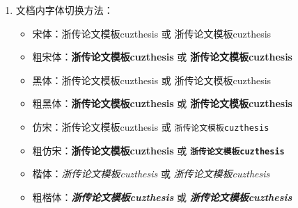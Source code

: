 \begin{enumerate}
\begin{itemize}
            \item 文档超链接的颜色及其显示：修改 \verb|\hypersetup|
        \end{itemize}
    \item 文档内字体切换方法：
        \begin{itemize}
            \item 宋体：浙传论文模板cuzthesis 或 \textrm{浙传论文模板cuzthesis}
            \item 粗宋体：{\bfseries 浙传论文模板cuzthesis} 或 \textbf{浙传论文模板cuzthesis}
            \item 黑体：{\sffamily 浙传论文模板cuzthesis} 或 \textsf{浙传论文模板cuzthesis}
            \item 粗黑体：{\bfseries\sffamily 浙传论文模板cuzthesis} 或 \textsf{\bfseries 浙传论文模板cuzthesis}
            \item 仿宋：{\ttfamily 浙传论文模板cuzthesis} 或 \texttt{浙传论文模板cuzthesis}
            \item 粗仿宋：{\bfseries\ttfamily 浙传论文模板cuzthesis} 或 \texttt{\bfseries 浙传论文模板cuzthesis}
            \item 楷体：{\itshape 浙传论文模板cuzthesis} 或 \textit{浙传论文模板cuzthesis}
            \item 粗楷体：{\bfseries\itshape 浙传论文模板cuzthesis} 或 \textit{\bfseries 浙传论文模板cuzthesis}
        \end{itemize}
\end{enumerate}


